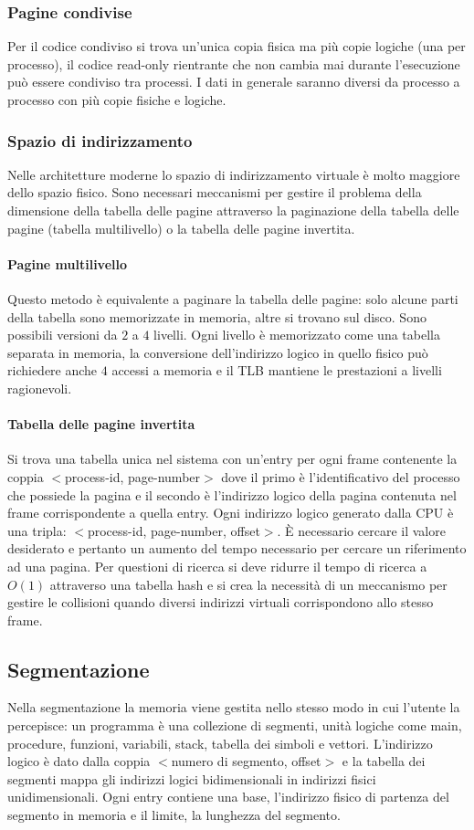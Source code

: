 \subsubsection{Pagine condivise}
Per il codice condiviso si trova un'unica copia fisica ma pi\`u copie logiche (una per processo), il codice read-only rientrante che non cambia mai durante l'esecuzione pu\`o essere
condiviso tra processi. I dati in generale saranno diversi da processo a processo con pi\`u copie fisiche e logiche. 
\subsubsection{Spazio di indirizzamento}
Nelle architetture moderne lo spazio di indirizzamento virtuale \`e molto maggiore dello spazio fisico. Sono necessari meccanismi per gestire il problema della dimensione della
tabella delle pagine attraverso la paginazione della tabella delle pagine (tabella multilivello) o la tabella delle pagine invertita. 
\paragraph{Pagine multilivello}
Questo metodo \`e equivalente a paginare la tabella delle pagine: solo alcune parti della tabella sono memorizzate in memoria, altre si trovano sul disco. Sono possibili versioni da
$2$ a $4$ livelli. Ogni livello \`e memorizzato come una tabella separata in memoria, la conversione dell'indirizzo logico in quello fisico pu\`o richiedere anche $4$ accessi a memoria
e il TLB mantiene le prestazioni a livelli ragionevoli. 
\paragraph{Tabella delle pagine invertita}
Si trova una tabella unica nel sistema con un'entry per ogni frame contenente la coppia $<$process-id, page-number$>$ dove il primo \`e l'identificativo del processo che possiede la
pagina e il secondo \`e l'indirizzo logico della pagina contenuta nel frame corrispondente a quella entry. Ogni indirizzo logico generato dalla CPU \`e una tripla: $<$process-id, 
page-number, offset$>$. \`E necessario cercare il valore desiderato e pertanto un aumento del tempo necessario per cercare un riferimento ad una pagina. Per questioni di ricerca si
deve ridurre il tempo di ricerca a $O(1)$ attraverso una tabella hash e si crea la necessit\`a di un meccanismo per gestire le collisioni quando diversi indirizzi virtuali corrispondono
allo stesso frame. 
\subsection{Segmentazione}
Nella segmentazione la memoria viene gestita nello stesso modo in cui l'utente la percepisce: un programma \`e una collezione di segmenti, unit\`a logiche come main, procedure, funzioni, 
variabili, stack, tabella dei simboli e vettori. L'indirizzo logico \`e dato dalla coppia $<$numero di segmento, offset$>$ e la tabella dei segmenti mappa gli indirizzi logici 
bidimensionali in indirizzi fisici unidimensionali. Ogni entry contiene una base, l'indirizzo fisico di partenza del segmento in memoria e il limite, la lunghezza del segmento. 
